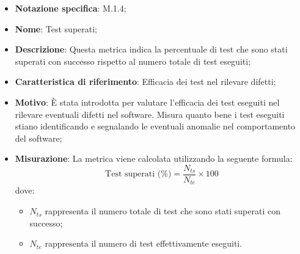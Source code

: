 \begin{itemize}
    \item \textbf{Notazione specifica}: M.1.4;
    \item \textbf{Nome}: Test superati;
    \item \textbf{Descrizione}: Questa metrica indica la percentuale di test che sono stati superati con successo rispetto al numero totale di test eseguiti;
    \item \textbf{Caratteristica di riferimento}: Efficacia dei test nel rilevare difetti;
    \item \textbf{Motivo}: È stata introdotta per valutare l'efficacia dei test eseguiti nel rilevare eventuali difetti nel software. Misura quanto bene i test eseguiti stiano identificando e segnalando le eventuali anomalie nel comportamento del software;
    \item \textbf{Misurazione}: La metrica viene calcolata utilizzando la seguente formula:
    \[
    \text{Test superati (\%)} = \frac{N_{ts}}{N_{te}} \times 100
    \]
    dove:
    \begin{itemize}
        \item $N_{ts}$ rappresenta il numero totale di test che sono stati superati con successo;
        \item $N_{te}$ rappresenta il numero di test effettivamente eseguiti.
    \end{itemize}
    
\end{itemize}
